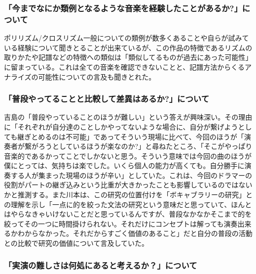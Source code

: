 \documentclass[uplatex,dvipdfmx]{ujarticle}
\begin{document}
\subsubsection{「今までなにか類例となるような音楽を経験したことがあるか?」について}

ポリリズム/クロスリズム一般についての類例が数多くあることや自らが試みている経験について聞きとることが出来ているが、この作品の特徴であるリズムの取りかたや記譜などの特徴への類似は「類似してるものが過去にあった可能性」に留まっている。これは全ての音楽を確認できないことと、記譜方法からくるアナライズの可能性についての言及も聞きとれた。

\subsubsection{「普段やってることと比較して差異はあるか?」について}

吉島の「普段やっていることのほうが難しい」という答えが興味深い。その理由に「それぞれが自分達のことしかやってないような場合に、自分が繋げようとしても継ぎとめるのは不可能」であってそういう現場に比べて、今回のほうが「演奏者が繋がろうとしているほうが楽なのか?」と尋ねたところ、「そこがやっぱり音楽的であるかってことでしかないと思う。そういう意味では今回の曲のほうが僕にとっては、気持ちは楽でした。いくら個人の能力が高くても。自分勝手に演奏する人が集まった現場のほうが辛い」としていた。これは、今回のドラマーの役割がパートの継ぎ込みという比重が大きかったことも影響しているのではないかと推測する。また川本は、この研究の位置付けを「ボキャブラリーの研究」との理解を示し「一点に的を絞った文法の研究という意味だと思っていて、ほんとはやらなきゃいけないことだと思っているんですが、普段なかなかそこまで的を絞ってその一つに時間掛けられない。それだけにコンセプトは解っても演奏出来るかわからなかった。それだからすごく価値のあること」だと自分の普段の活動との比較で研究の価値について言及していた。

\subsubsection{「実演の難しさは何処にあると考えるか？」について}
\end{document}
